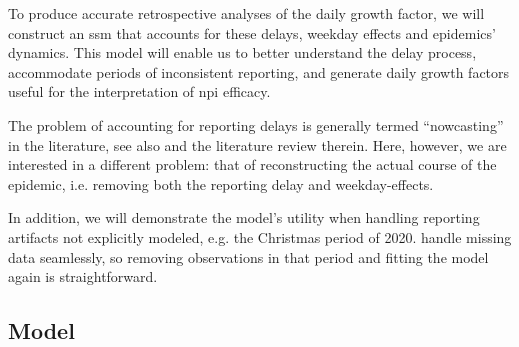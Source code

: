 To produce accurate retrospective analyses of the daily growth factor, we will construct an \gls{ssm} that accounts for these delays, weekday effects and epidemics' dynamics. This model will enable us to better understand the delay process, accommodate periods of inconsistent reporting, and generate daily growth factors useful for the interpretation of \gls{npi} efficacy.

The problem of accounting for reporting delays is generally termed ``{}nowcasting''{} in the literature, see also  and the literature review therein. Here, however, we are interested in a different problem: that of reconstructing the actual course of the epidemic, i.e. removing both the reporting delay and weekday-effects.

In addition, we will demonstrate the model's utility when handling reporting artifacts not explicitly modeled, e.g. the Christmas period of 2020.  handle missing data seamlessly, so removing observations in that period and fitting the model again is straightforward.

\subsection{Model}

